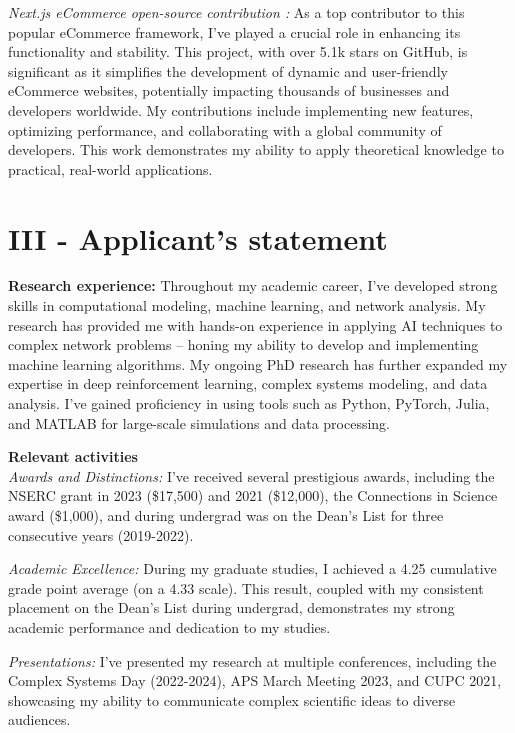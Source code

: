 \begin{contributions}
\textit{Next.js eCommerce open-source contribution :} As a top contributor to this popular eCommerce framework, I've played a crucial role in enhancing its functionality and stability. This project, with over 5.1k stars on GitHub, is significant as it simplifies the development of dynamic and user-friendly eCommerce websites, potentially impacting thousands of businesses and developers worldwide. My contributions include implementing new features, optimizing performance, and collaborating with a global community of developers. This work demonstrates my ability to apply theoretical knowledge to practical, real-world applications.

\section*{III - Applicant's statement}
\vspace{-1.5em}
\textbf{Research experience:} Throughout my academic career, I've developed strong skills in computational modeling, machine learning, and network analysis. My research has provided me with hands-on experience in applying AI techniques to complex network problems -- honing my ability to develop and implementing machine learning algorithms. My ongoing PhD research has further expanded my expertise in deep reinforcement learning, complex systems modeling, and data analysis. I've gained proficiency in using tools such as Python, PyTorch, Julia, and MATLAB for large-scale simulations and data processing.


\textbf{Relevant activities}\\
\textit{Awards and Distinctions:} I've received several prestigious awards, including the NSERC grant in 2023 (\$17,500) and 2021 (\$12,000), the Connections in Science award (\$1,000), and during undergrad was on the Dean's List for three consecutive years (2019-2022).

\textit{Academic Excellence:} During my graduate studies, I achieved a 4.25 cumulative grade point average (on a 4.33 scale). This result, coupled with my consistent placement on the Dean's List during undergrad, demonstrates my strong academic performance and dedication to my studies.

\textit{Presentations:} I've presented my research at multiple conferences, including the Complex Systems Day (2022-2024), APS March Meeting 2023, and CUPC 2021, showcasing my ability to communicate complex scientific ideas to diverse audiences.


\end{contributions}
